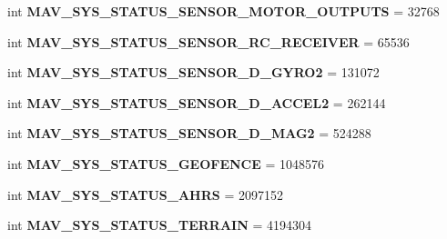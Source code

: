 \begin{DoxyCompactItemize}
int {\bfseries M\+A\+V\+\_\+\+S\+Y\+S\+\_\+\+S\+T\+A\+T\+U\+S\+\_\+\+S\+E\+N\+S\+O\+R\+\_\+\+M\+O\+T\+O\+R\+\_\+\+O\+U\+T\+P\+U\+TS} = 32768
\item 
\mbox{\label{namespacepymavlink_1_1dialects_1_1v10_ab5759328810977e2a4d1915966b12229}} 
int {\bfseries M\+A\+V\+\_\+\+S\+Y\+S\+\_\+\+S\+T\+A\+T\+U\+S\+\_\+\+S\+E\+N\+S\+O\+R\+\_\+\+R\+C\+\_\+\+R\+E\+C\+E\+I\+V\+ER} = 65536
\item 
\mbox{\label{namespacepymavlink_1_1dialects_1_1v10_a221183d46f48692cb51db47803f2213c}} 
int {\bfseries M\+A\+V\+\_\+\+S\+Y\+S\+\_\+\+S\+T\+A\+T\+U\+S\+\_\+\+S\+E\+N\+S\+O\+R\+\_\+D\+\_\+\+G\+Y\+R\+O2} = 131072
\item 
\mbox{\label{namespacepymavlink_1_1dialects_1_1v10_ad8004bc23143bc3626781b6c9d98a283}} 
int {\bfseries M\+A\+V\+\_\+\+S\+Y\+S\+\_\+\+S\+T\+A\+T\+U\+S\+\_\+\+S\+E\+N\+S\+O\+R\+\_\+D\+\_\+\+A\+C\+C\+E\+L2} = 262144
\item 
\mbox{\label{namespacepymavlink_1_1dialects_1_1v10_a137eabaaa8459885895dbd75b14f75b1}} 
int {\bfseries M\+A\+V\+\_\+\+S\+Y\+S\+\_\+\+S\+T\+A\+T\+U\+S\+\_\+\+S\+E\+N\+S\+O\+R\+\_\+D\+\_\+\+M\+A\+G2} = 524288
\item 
\mbox{\label{namespacepymavlink_1_1dialects_1_1v10_a46684efccf9e7a3485680a1a985fd8b8}} 
int {\bfseries M\+A\+V\+\_\+\+S\+Y\+S\+\_\+\+S\+T\+A\+T\+U\+S\+\_\+\+G\+E\+O\+F\+E\+N\+CE} = 1048576
\item 
\mbox{\label{namespacepymavlink_1_1dialects_1_1v10_a2da9272db20df9033e6cacd31883abce}} 
int {\bfseries M\+A\+V\+\_\+\+S\+Y\+S\+\_\+\+S\+T\+A\+T\+U\+S\+\_\+\+A\+H\+RS} = 2097152
\item 
\mbox{\label{namespacepymavlink_1_1dialects_1_1v10_a7270f18b0944cc2943b815f194df33f3}} 
int {\bfseries M\+A\+V\+\_\+\+S\+Y\+S\+\_\+\+S\+T\+A\+T\+U\+S\+\_\+\+T\+E\+R\+R\+A\+IN} = 4194304
\item 
\mbox{\label{namespacepymavlink_1_1dialects_1_1v10_a4587bf2d18e46ad403d9e70452018794}} 

\end{DoxyCompactItemize}
